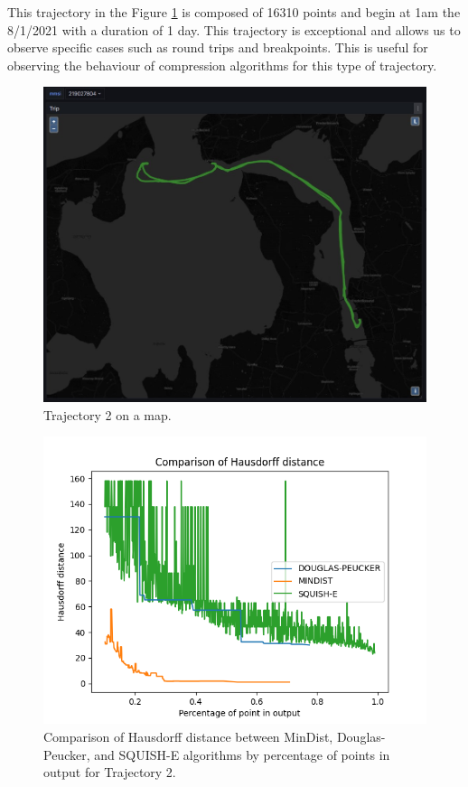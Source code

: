 This trajectory in the Figure \ref{fig:traj2} is composed of 16310 points and begin at 1am the 8/1/2021 with a duration of 1 day. This trajectory is exceptional and allows us to observe specific cases such as round trips and breakpoints. This is useful for observing the behaviour of compression algorithms for this type of trajectory. 

\begin{figure}
	\centering
	\includegraphics[width=0.7\linewidth]{figures/Stats/traj2.jpg}
	\caption{Trajectory 2 on a map.}
	\label{fig:traj2}
\end{figure}


\begin{figure}
	\centering
	\includegraphics[width=0.9\linewidth]{figures/Stats/hausdorff_comp2.png}
	\caption{Comparison of Hausdorff distance between MinDist, Douglas-Peucker, and SQUISH-E algorithms by percentage of points in output  for Trajectory 2.}
	\label{fig:comp_h2}
\end{figure}

